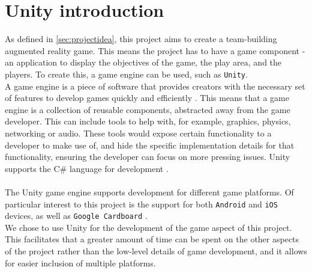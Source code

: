 \section{Unity introduction}\label{sec:unity-intro}
As defined in \autoref{sec:projectidea}, this project aims to create a team-building augmented reality game.
This means the project has to have a game component - an application to display the objectives of the game, the play area, and the players.
To create this, a game engine can be used, such as \texttt{Unity}. \\
A game engine is a piece of software that provides creators with the necessary set of features to develop games quickly and efficiently \cite{gameengine}.
This means that a game engine is a collection of reusable components, abstracted away from the game developer.
This can include tools to help with, for example, graphics, physics, networking or audio.
These tools would expose certain functionality to a developer to make use of, and hide the specific implementation details for that functionality, ensuring the developer can focus on more pressing issues.
Unity supports the C\# language for development \cite{unitylanguage}.
\\\\
The Unity game engine supports development for different game platforms.
Of particular interest to this project is the support for both \texttt{Android} and \texttt{iOS} devices, as well as \texttt{Google Cardboard} \cite{unityplatforms}.\\
We chose to use Unity for the development of the game aspect of this project.
This facilitates that a greater amount of time can be spent on the other aspects of the project rather than the low-level details of game development, and it allows for easier inclusion of multiple platforms.
